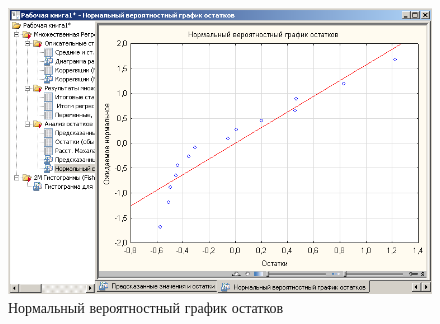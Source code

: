 \begin{figure}[!h]
  \centering

  \includegraphics[width=16cm]
  {inc/var5__36.PNG}

  \caption{Нормальный вероятностный график остатков}

  \label{fig:var5__36}
\end{figure}
